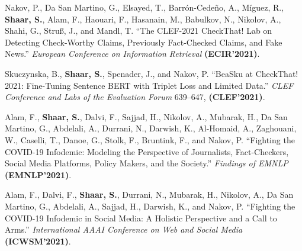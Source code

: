 \begin{publist}
  \item Nakov, P., Da San Martino, G., Elsayed, T., Barr\'on-Cede\~no, A., M\'iguez, R., \textbf{Shaar, S.}, Alam, F., Haouari, F., Hasanain, M., Babulkov, N., Nikolov, A., Shahi, G., Stru{\ss}, J., and Mandl, T. ``The CLEF-2021 CheckThat! Lab on Detecting Check-Worthy Claims, Previously Fact-Checked Claims, and Fake News.'' \textit{European Conference on Information Retrieval} \textbf{(ECIR'2021)}.



  \item Skuczynska, B., \textbf{Shaar, S.}, Spenader, J., and Nakov, P. ``BeaSku at CheckThat! 2021: Fine-Tuning Sentence BERT with Triplet Loss and Limited Data.'' \textit{CLEF Conference and Labs of the Evaluation Forum} 639--647, \textbf{(CLEF'2021)}.

  \item Alam, F., \textbf{Shaar, S.}, Dalvi, F., Sajjad, H., Nikolov, A., Mubarak, H., Da San Martino, G., Abdelali, A., Durrani, N., Darwish, K., Al-Homaid, A., Zaghouani, W., Caselli, T., Danoe, G., Stolk, F., Bruntink, F., and Nakov, P. ``Fighting the COVID-19 Infodemic: Modeling the Perspective of Journalists, Fact-Checkers, Social Media Platforms, Policy Makers, and the Society.'' \textit{Findings of EMNLP} \textbf{(EMNLP'2021)}.

  \item Alam, F., Dalvi, F., \textbf{Shaar, S.}, Durrani, N., Mubarak, H., Nikolov, A., Da San Martino, G., Abdelali, A., Sajjad, H., Darwish, K., and Nakov, P. ``Fighting the COVID-19 Infodemic in Social Media: A Holistic Perspective and a Call to Arms.'' \textit{International AAAI Conference on Web and Social Media} \textbf{(ICWSM'2021)}.


\end{publist}
